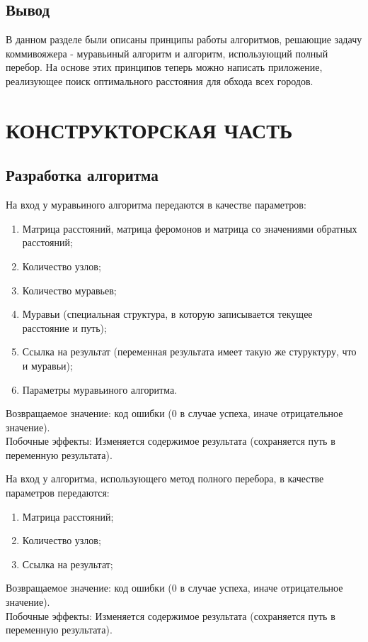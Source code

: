 \documentclass[a4paper,12pt]{article}
\begin{document}
\newpage
\subsection{Вывод}
В данном разделе были описаны принципы работы алгоритмов, решающие задачу коммивояжера - муравьиный алгоритм и алгоритм, использующий полный перебор. На основе этих принципов теперь можно написать приложение, реализующее поиск оптимального расстояния для обхода всех городов.


\newpage
\section{КОНСТРУКТОРСКАЯ ЧАСТЬ}

\subsection{Разработка алгоритма}
На вход у муравьиного алгоритма передаются в качестве параметров:
\begin{enumerate}
\item Матрица расстояний, матрица феромонов и матрица со значениями обратных расстояний;
\item Количество узлов;
\item Количество муравьев;
\item Муравьи (специальная структура, в которую записывается текущее расстояние и путь);
\item Ссылка на результат (переменная результата имеет такую же стуруктуру, что и муравьи);
\item Параметры муравьиного алгоритма.
\end{enumerate}
Возвращаемое значение: код ошибки (0 в случае успеха, иначе отрицательное значение). \\
Побочные эффекты:
Изменяется содержимое результата (сохраняется путь в переменную результата).

На вход у алгоритма, использующего метод полного перебора, в качестве параметров передаются:
\begin{enumerate}
\item Матрица расстояний;
\item Количество узлов;
\item Ссылка на результат;
\end{enumerate}
Возвращаемое значение: код ошибки (0 в случае успеха, иначе отрицательное значение). \\
Побочные эффекты:
Изменяется содержимое результата (сохраняется путь в переменную результата).
\end{document}
